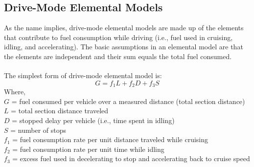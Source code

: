 \subsection{Drive-Mode Elemental Models}
As the name implies, drive-mode elemental models are made up of the elements that contribute to fuel consumption while driving (i.e., fuel used in cruising, idling, and accelerating). The basic assumptions in an elemental model are that the elements are independent and their sum equals the total fuel consumed.\\\\
The simplest form of drive-mode elemental model is:
\begin{equation}
	G = f_1 L + f_2 D + f_3 S
\end{equation}
Where,\\
\hspace*{10mm} $ G $ = fuel consumed per vehicle over a measured distance (total section distance)\\
\hspace*{10mm} $ L $ = total section distance traveled\\
\hspace*{10mm} $ D $ = stopped delay per vehicle (i.e., time spent in idling)\\
\hspace*{10mm} $ S $ = number of stops\\
\hspace*{10mm} $ f_1 $ = fuel consumption rate per unit distance traveled while cruising\\
\hspace*{10mm} $ f_2 $ = fuel consumption rate per unit time while idling\\
\hspace*{10mm} $ f_3 $ = excess fuel used in decelerating to stop and accelerating back to cruise speed
%
